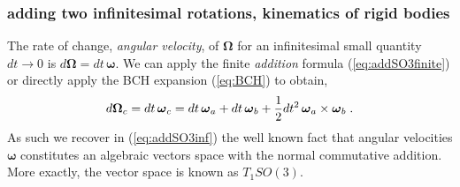 \documentclass[conference]{IEEEtran}
\newcommand{\bfomega}{\boldsymbol{\omega}}
\newcommand{\bfOmega}{\boldsymbol{\Omega}}
\newcommand{\beq}{\begin{equation}}
\newcommand{\eeq}{\end{equation}}
\begin{document}
\begin{appendix}
\subsubsection{adding two infinitesimal rotations, kinematics of rigid bodies}
The rate of change, {\em angular velocity}, of $\bfOmega$ for an infinitesimal small quantity $dt\rightarrow 0$
is $d\bfOmega = dt\, \bfomega$. We can apply the finite {\em addition} formula (\ref{eq:addSO3finite}) or
directly apply the BCH expansion (\ref{eq:BCH}) to obtain,
\beq
    d\bfOmega_c = dt\, \bfomega_c = dt\, \bfomega_a + dt\, \bfomega_b + {1\over 2} dt^2\, \bfomega_a\times\bfomega_b\;.
    \label{eq:addSO3inf}
\eeq
As such we recover in (\ref{eq:addSO3inf}) the well known fact that angular velocities $\bfomega$
constitutes an algebraic vectors space with the normal commutative addition. More exactly, the
vector space is known as $T_1SO(3)$.


\end{appendix}
\end{document}
